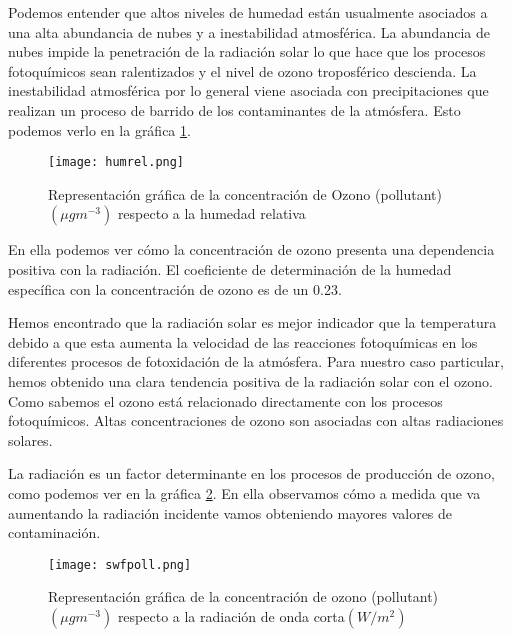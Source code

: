\documentclass[12pt]{article}
\begin{document}
Podemos entender que altos niveles de humedad están usualmente asociados a una alta abundancia de nubes y a  inestabilidad atmosférica. La abundancia de nubes impide la penetración de la radiación solar lo que hace que los  procesos fotoquímicos sean ralentizados y el nivel de ozono troposférico descienda. La inestabilidad atmosférica por lo general viene asociada con precipitaciones que realizan un proceso de barrido de los contaminantes de la atmósfera. Esto podemos verlo en la gráfica \ref{fig:4}. 



\begin{figure}[h]
\centering
    \texttt{[image: humrel.png]}
    \caption[Concentración de Ozono y humedad relativa]{Representación gráfica de la concentración de Ozono (pollutant)  $(\mu g  m^{-3})$ respecto a la humedad relativa} \label{fig:4}
\end{figure}
En ella podemos ver cómo la concentración de ozono presenta una dependencia positiva con la radiación.  El coeficiente de determinación de la humedad específica con la concentración de ozono es de un 0.23.   %

 Hemos encontrado que la radiación solar es mejor indicador que la temperatura debido a que esta aumenta la velocidad de las reacciones fotoquímicas en los diferentes  procesos de fotoxidación de la atmósfera. 
Para nuestro caso particular, hemos obtenido una clara tendencia positiva de la radiación solar con el ozono. Como sabemos el ozono está relacionado directamente con los procesos fotoquímicos. Altas concentraciones de ozono son asociadas con altas radiaciones solares.

La radiación es un factor determinante en los procesos de producción de ozono, como podemos ver en la gráfica \ref{fig:5}. En ella observamos cómo a medida que va aumentando la radiación incidente vamos obteniendo mayores valores de contaminación.
\begin{figure}[h]
\centering
    \texttt{[image: swfpoll.png]}
    \caption[Concentración de Ozono y radiación de onda corta]{Representación gráfica de la concentración de ozono (pollutant)  $(\mu g  m^{-3})$ respecto a la radiación de onda corta$(W/m^2)$} \label{fig:5}
\end{figure}
\end{document}
